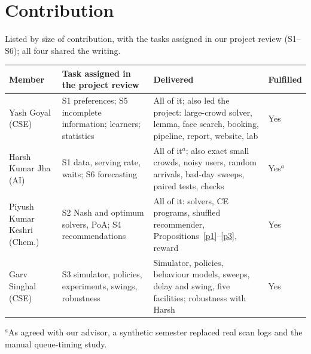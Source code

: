 \documentclass{article}
\begin{document}
\section{Contribution}
Listed by size of contribution, with the tasks assigned in our project review (S1--S6); all four shared the writing.
\begin{table}[H]\centering\footnotesize
\begin{tabular}{@{}>{\raggedright\arraybackslash}p{2.6cm}>{\raggedright\arraybackslash}p{4.3cm}>{\raggedright\arraybackslash}p{7.2cm}l@{}}\toprule
Member & Task assigned in the project review & Delivered & Fulfilled\\\midrule
Yash Goyal (CSE) & S1 preferences; S5 incomplete information; learners; statistics & All of it; also led the project:
large-crowd solver, lemma, face search, booking, pipeline, report, website, lab & Yes\\
Harsh Kumar Jha (AI) & S1 data, serving rate, waits; S6 forecasting & All of it$^{a}$; also exact small crowds, noisy
users, random arrivals, bad-day sweeps, paired tests, checks & Yes$^{a}$\\
Piyush Kumar Keshri (Chem.) & S2 Nash and optimum solvers, PoA; S4 recommendations & All of it: solvers, CE
programs, shuffled recommender, Propositions~\ref{p1}--\ref{p3}, reward & Yes\\
Garv Singhal (CSE) & S3 simulator, policies, experiments, swings, robustness & Simulator, policies, behaviour models,
sweeps, delay and swing, five facilities; robustness with Harsh & Yes\\\bottomrule
\end{tabular}

\vspace{1pt}\raggedright $^{a}$As agreed with our advisor, a synthetic semester replaced real scan logs and the manual
queue-timing study.
\end{table}
\end{document}
